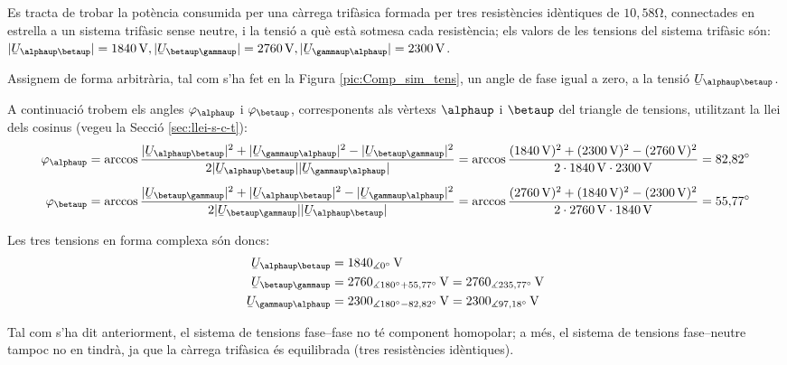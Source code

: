 \begin{exemple}
Es tracta de trobar la pot\`{e}ncia consumida per una c\`{a}rrega trif\`{a}sica
formada per tres resist\`{e}ncies id\`{e}ntiques de $10{,}58\unit{\ohm}$,
connectades en estrella a un sistema trif\`{a}sic sense neutre, i la
tensi\'{o} a qu\`{e} est\`{a} sotmesa cada resist\`{e}ncia; els valors de les
tensions del sistema trif\`{a}sic s\'{o}n: $|\cmplx{U}_{\alphaup\betaup}| =
1840\unit{V}, |\cmplx{U}_{\betaup\gammaup}| = 2760\unit{V},
|\cmplx{U}_{\gammaup\alphaup}| = 2300\unit{V}$.

Assignem de forma arbitr\`{a}ria, tal com s'ha fet en la Figura
\vref{pic:Comp_sim_tens}, un angle de fase igual a zero, a la tensi\'{o}
$\cmplx{U}_{\alphaup\betaup}$.

A continuaci\'{o} trobem els angles $\varphi_\alphaup$ i $\varphi_\betaup$,
corresponents als v\`{e}rtexs  $\alphaup$ i $\betaup$ del triangle de
tensions, utilitzant la llei dels cosinus (vegeu la Secci\'{o}
\vref{sec:llei-s-c-t}): 
\begin{align*}
    \varphi_\alphaup &= \arccos \frac{|\cmplx{U}_{\alphaup\betaup}|^2 + |\cmplx{U}_{\gammaup\alphaup}|^2 -
    |\cmplx{U}_{\betaup\gammaup}|^2}{2 |\cmplx{U}_{\alphaup\betaup}| |\cmplx{U}_{\gammaup\alphaup}|} =
    \arccos \frac{(1840\unit{V})^2 + (2300\unit{V})^2 - (2760\unit{V})^2}{2 \cdot 1840\unit{V}
    \cdot 2300\unit{V}} = 82{,}82\degree \\[1ex]
    \varphi_\betaup &= \arccos \frac{|\cmplx{U}_{\betaup\gammaup}|^2 + |\cmplx{U}_{\alphaup\betaup}|^2 -
    |\cmplx{U}_{\gammaup\alphaup}|^2}{2 |\cmplx{U}_{\betaup\gammaup}| |\cmplx{U}_{\alphaup\betaup}|} =
    \arccos \frac{(2760\unit{V})^2 + (1840\unit{V})^2 - (2300\unit{V})^2}{2 \cdot 2760\unit{V}
    \cdot 1840\unit{V}} = 55{,}77\degree
\end{align*}

Les tres tensions en forma complexa s\'{o}n doncs:
\begin{align*}
\cmplx{U}_{\alphaup\betaup} &= 1840_{\measuredangle 0\degree}\unit{V} \\
\cmplx{U}_{\betaup\gammaup} &= 2760_{\measuredangle 180\degree +
55{,}77\degree}\unit{V} =
2760_{\measuredangle 235{,}77\degree}\unit{V} \\
\cmplx{U}_{\gammaup\alphaup} &= 2300_{\measuredangle 180\degree -
82{,}82\degree}\unit{V} = 2300_{\measuredangle 97{,}18\degree}
\unit{V}
\end{align*}

Tal com s'ha dit anteriorment, el sistema de tensions fase--fase no
t\'{e} component homopolar; a m\'{e}s, el sistema de tensions fase--neutre
tampoc no en tindr\`{a}, ja que la c\`{a}rrega trif\`{a}sica \'{e}s equilibrada
(tres resist\`{e}ncies id\`{e}ntiques).


\end{exemple}
